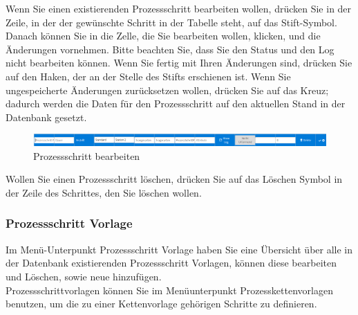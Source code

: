 \documentclass[enabledeprecatedfontcommands,fontsize=12pt,paper=a4,twoside]{scrartcl}
\begin{document}
Wenn Sie einen existierenden Prozessschritt bearbeiten wollen, drücken Sie in der Zeile, in der der gewünschte Schritt in der Tabelle steht, auf das Stift-Symbol. Danach können Sie in die Zelle, die Sie bearbeiten wollen, klicken, und die Änderungen vornehmen. Bitte beachten Sie, dass Sie den Status und den Log nicht bearbeiten können. Wenn Sie fertig mit Ihren Änderungen sind, drücken Sie auf den Haken, der an der Stelle des Stifts erschienen ist. Wenn Sie ungespeicherte Änderungen zurücksetzen wollen, drücken Sie auf das Kreuz; dadurch werden die Daten für den Prozessschritt auf den aktuellen Stand in der Datenbank gesetzt. \\

\begin{figure}[h!]
\begin{center}
 \includegraphics[scale=0.6]{screenshots/pk/prozessschrittedit.png}
  \caption{Prozessschritt bearbeiten}
  \label{fig:boat1}
\end{center}
\end{figure}

Wollen Sie einen Prozessschritt löschen, drücken Sie auf das Löschen Symbol in der Zeile des Schrittes, den Sie löschen wollen. \\

\subsubsection{Prozessschritt Vorlage}

Im Menü-Unterpunkt Prozessschritt Vorlage haben Sie eine Übersicht über alle in der Datenbank existierenden Prozessschritt Vorlagen, können diese bearbeiten und Löschen, sowie neue hinzufügen. \\

Prozessschrittvorlagen können Sie im Menüunterpunkt Prozesskettenvorlagen benutzen, um die zu einer Kettenvorlage gehörigen Schritte zu definieren. \\
\end{document}
